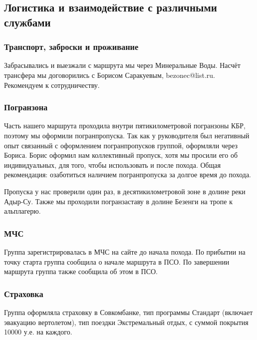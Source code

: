 	\subsection{Логистика и взаимодействие с различными службами}
		\subsubsection{Транспорт, заброски и проживание}
		Забрасывались и выезжали с маршрута мы через Минеральные Воды. Насчёт трансфера мы договорились с Борисом Саракуевым, bezonec@list.ru. Рекомендуем к сотрудничеству.

		\subsubsection{Погранзона}

		Часть нашего маршрута проходила внутри пятикилометровой погранзоны КБР, поэтому мы оформили погранпропуска. Так как у руководителя был негативный опыт связанный с оформлением погранпропусков группой, оформляли через Бориса. Борис оформил нам коллективный пропуск, хотя мы просили его об индивидуальных, для того, чтобы использовать и после похода. Общая рекомендация: озаботиться наличием погранпропуска за долгое время до похода.

		Пропуска у нас проверили один раз, в десятикилометровой зоне в долине реки Адыр-Су. Также мы проходили погранзаставу в долине Безенги на тропе к альплагерю.


		\subsubsection{МЧС}
		Группа зарегистрировалась в МЧС на сайте до начала похода. По прибытии на точку старта группа сообщила о начале маршрута в ПСО. По завершении маршрута группа также сообщила об этом в ПСО.



		\subsubsection{Страховка}
			Группа оформляла страховку в Совкомбанке, тип программы Стандарт (включает эвакуацию вертолетом), тип поездки Экстремальный отдых, с суммой покрытия 10000 у.е. на каждого. 
 
